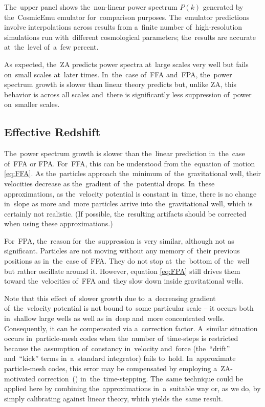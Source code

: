 The~upper panel shows the~non-linear power spectrum $P(k)$ generated by the~CosmicEmu emulator \parencite{Heitmann:2015xma} for~comparison purposes. The~emulator predictions involve interpolations across results from a~finite number of~high-resolution simulations run with~different cosmological parameters; the~results are accurate at~the~level of~a~few percent.

As expected, the~ZA predicts power spectra at~large scales very well but fails on~small scales at~later times. In~the~case of~FFA and~FPA, the~power spectrum growth is slower than linear theory predicts but, unlike ZA, this behavior is across all scales and~there is significantly less suppression of~power on~smaller scales. 
\subsection{Effective Redshift}
\label{sec:z_eff}
The~power spectrum growth is slower than the~linear prediction in~the~case of~FFA or FPA. For~FFA, this can be understood from the~equation of~motion \eqref{eq:FFA}. As the~particles approach the~minimum of~the~gravitational well, their velocities decrease as the~gradient of~the~potential drops. In~these approximations, as the~velocity potential is constant in~time, there is no change in~slope as more and~more particles arrive into the~gravitational well, which is certainly not realistic. (If possible, the~resulting artifacts should be corrected when using these approximations.)

For~FPA, the~reason for~the~suppression is very similar, although not as significant. Particles are not moving without any memory of~their previous positions as in~the~case of~FFA. They do not stop at~the~bottom of~the~well but rather oscillate around it. However, equation \eqref{eq:FPA} still drives them toward the~velocities of~FFA and~they slow down inside gravitational wells.

Note that this effect of~slower growth due to~a~decreasing gradient of~the~velocity potential is not bound to~some particular scale -- it occurs both in~shallow large wells as well as in~deep and~more concentrated wells. Consequently, it can be compensated via a~correction factor. A~similar situation occurs in~particle-mesh codes when the~number of~time-steps is restricted because the~assumption of~constancy in~velocity and~force (the~``drift'' and~``kick'' terms in~a~standard integrator) fails to~hold. In~approximate particle-mesh codes, this error may be compensated by employing a~ZA-motivated correction~(\cite{Ref:Feng}) in~the~time-stepping. The~same technique could be applied here by combining the~approximations in~a~suitable way or, as we do, by simply calibrating against linear theory, which yields the~same result.

